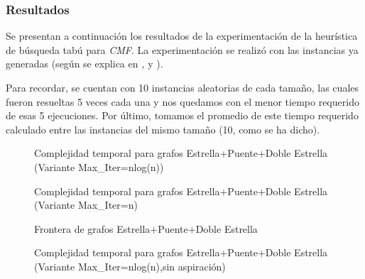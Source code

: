 \subsubsection{Resultados}
\par Se presentan a continuaci\'on los resultados de la experimentaci\'on
    de la heur\'istica de b\'usqueda tab\'u para \emph{CMF}. La experimentaci\'on se realiz\'o
    con las instancias ya generadas (seg\'un se explica en \emph{,
    } y \emph{}).

\par Para recordar, se cuentan con 10 instancias aleatorias de cada tama\~no,
    las cuales fueron resueltas 5 veces cada una y nos quedamos con el menor tiempo
    requerido de esas 5 ejecuciones. Por \'ultimo, tomamos el promedio de este tiempo
    requerido calculado entre las instancias del mismo tama\~no (10, como se ha
    dicho).


\begin{figure}[H]
    \centering
    \fontsize{8}{10}\selectfont
    \resizebox{0.8\textwidth}{!}{}
    \caption{Complejidad temporal para grafos Estrella+Puente+Doble Estrella (Variante Max\_Iter=nlog(n))}
\end{figure}

\begin{figure}[H]
    \centering
    \fontsize{8}{10}\selectfont
    \resizebox{0.8\textwidth}{!}{}
    \caption{Complejidad temporal para grafos Estrella+Puente+Doble Estrella (Variante Max\_Iter=n)}
\end{figure}

\begin{figure}[H]
    \centering
    \fontsize{8}{10}\selectfont
    \resizebox{0.8\textwidth}{!}{}
    \caption{Frontera de grafos Estrella+Puente+Doble Estrella}
\end{figure}

\begin{figure}[H]
    \centering
    \fontsize{8}{10}\selectfont
    \resizebox{0.8\textwidth}{!}{}
    \caption{Complejidad temporal para grafos Estrella+Puente+Doble Estrella (Variante Max\_Iter=nlog(n),sin aspiraci\'on)}
\end{figure}

